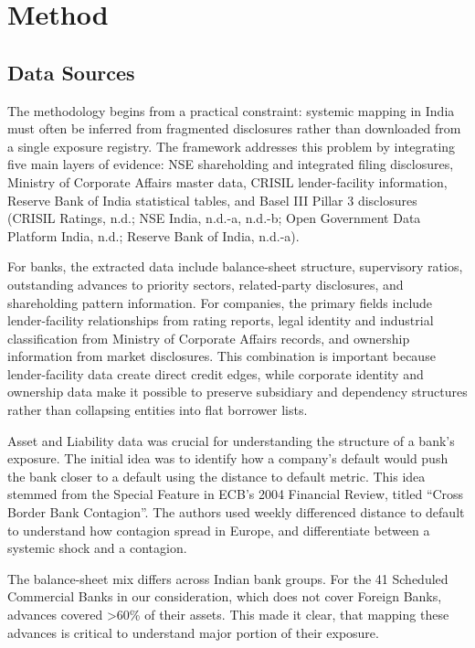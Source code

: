 \documentclass[12pt]{article}
\begin{document}
\section*{Method}

\subsection*{Data Sources}

The methodology begins from a practical constraint: systemic mapping in India must often be inferred from fragmented disclosures rather than downloaded from a single exposure registry. The framework addresses this problem by integrating five main layers of evidence: NSE shareholding and integrated filing disclosures, Ministry of Corporate Affairs master data, CRISIL lender-facility information, Reserve Bank of India statistical tables, and Basel III Pillar 3 disclosures (CRISIL Ratings, n.d.; NSE India, n.d.-a, n.d.-b; Open Government Data Platform India, n.d.; Reserve Bank of India, n.d.-a).

For banks, the extracted data include balance-sheet structure, supervisory ratios, outstanding advances to priority sectors, related-party disclosures, and shareholding pattern information. For companies, the primary fields include lender-facility relationships from rating reports, legal identity and industrial classification from Ministry of Corporate Affairs records, and ownership information from market disclosures. This combination is important because lender-facility data create direct credit edges, while corporate identity and ownership data make it possible to preserve subsidiary and dependency structures rather than collapsing entities into flat borrower lists.

Asset and Liability data was crucial for understanding the structure of a bank’s exposure. The initial idea was to identify how a company’s default would push the bank closer to a default using the distance to default metric. This idea stemmed from the Special Feature in ECB’s 2004 Financial Review, titled “Cross Border Bank Contagion”. The authors used weekly differenced distance to default to understand how contagion spread in Europe, and differentiate between a systemic shock and a contagion.

The balance-sheet mix differs across Indian bank groups. For the 41 Scheduled Commercial Banks in our consideration, which does not cover Foreign Banks, advances covered >60\% of their assets. This made it clear, that mapping these advances is critical to understand major portion of their exposure.
\end{document}
